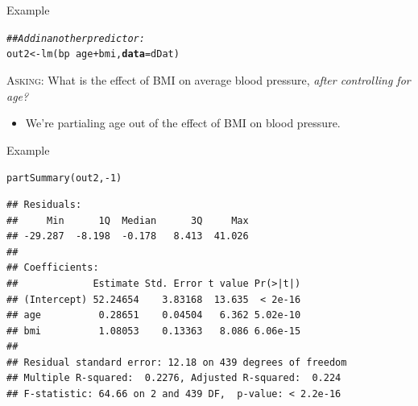 \documentclass[10pt]{beamer}\usepackage[]{graphicx}\usepackage[]{color}
\makeatletter
\newcommand{\hlnum}[1]{\textcolor[rgb]{0.69,0.494,0}{#1}}%
\newcommand{\hlcom}[1]{\textcolor[rgb]{0.514,0.506,0.514}{\textit{#1}}}%
\newcommand{\hlopt}[1]{\textcolor[rgb]{0,0,0}{#1}}%
\newcommand{\hlstd}[1]{\textcolor[rgb]{0,0,0}{#1}}%
\newcommand{\hlkwb}[1]{\textcolor[rgb]{0,0.341,0.682}{#1}}%
\newcommand{\hlkwc}[1]{\textcolor[rgb]{0,0,0}{\textbf{#1}}}%
\newcommand{\hlkwd}[1]{\textcolor[rgb]{0.004,0.004,0.506}{#1}}%
\newenvironment{kframe}{%
 \def\at@end@of@kframe{}%
 \ifinner\ifhmode%
  \def\at@end@of@kframe{\end{minipage}}%
  \begin{minipage}{\columnwidth}%
 \fi\fi%
 \def\FrameCommand##1{\hskip\@totalleftmargin \hskip-\fboxsep
 \colorbox{shadecolor}{##1}\hskip-\fboxsep
     \hskip-\linewidth \hskip-\@totalleftmargin \hskip\columnwidth}%
 \MakeFramed {\advance\hsize-\width
   \@totalleftmargin\z@ \linewidth\hsize
   \@setminipage}}%
 {\par\unskip\endMakeFramed%
 \at@end@of@kframe}
\newenvironment{knitrout}{}{} %
\makeatother
\begin{document}
\begin{frame}[fragile]{Example}

\begin{knitrout}\footnotesize
{}\color{fgcolor}\begin{kframe}
\begin{alltt}
\hlcom{## Add in another predictor:}
\hlstd{out2} \hlkwb{<-} \hlkwd{lm}\hlstd{(bp} \hlopt{~} \hlstd{age} \hlopt{+} \hlstd{bmi,} \hlkwc{data} \hlstd{= dDat)}
\end{alltt}
\end{kframe}
\end{knitrout}

\va

\textsc{Asking}: What is the effect of BMI on average blood pressure,
\emph{after controlling for age?}
\vb
\begin{itemize}
  \item We're partialing age out of the effect of BMI on blood pressure.
\end{itemize}

\end{frame}

\watermarkoff %

\begin{frame}{Example}

\begin{knitrout}\footnotesize
{}\color{fgcolor}\begin{kframe}
\begin{alltt}
\hlkwd{partSummary}\hlstd{(out2,} \hlopt{-}\hlnum{1}\hlstd{)}
\end{alltt}
\begin{verbatim}
## Residuals:
##     Min      1Q  Median      3Q     Max 
## -29.287  -8.198  -0.178   8.413  41.026 
## 
## Coefficients:
##             Estimate Std. Error t value Pr(>|t|)
## (Intercept) 52.24654    3.83168  13.635  < 2e-16
## age          0.28651    0.04504   6.362 5.02e-10
## bmi          1.08053    0.13363   8.086 6.06e-15
## 
## Residual standard error: 12.18 on 439 degrees of freedom
## Multiple R-squared:  0.2276,	Adjusted R-squared:  0.224 
## F-statistic: 64.66 on 2 and 439 DF,  p-value: < 2.2e-16
\end{verbatim}
\end{kframe}
\end{knitrout}

\end{frame}
\end{document}

